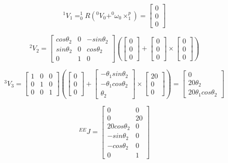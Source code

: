 \documentclass[12pt]{article}
\begin{document}
\[
^1 V_1=^1_0 R\left(^0 V_0 + ^0 \omega_0 \times ^p_1\right) =  
\left[
\begin{array}{c}
0\\
0\\
0
\end{array} \right] 
\]

\[
^2 V_2 = \left[
\begin{array}{ccc}
cos\theta_2 & 0 & -sin\theta_2 \\
sin\theta_2 & 0 & cos\theta_2\\
0 & 1 & 0 
\end{array} \right]
\left(
\left[
\begin{array}{c}
0\\
0\\
0
\end{array} \right] +
\left[
\begin{array}{c}
0\\
0\\
0
\end{array} \right] \times
\left[
\begin{array}{c}
0\\
0\\
0
\end{array} \right] \right)
\]

\[
^3 V_3 = \left[
\begin{array}{ccc}
1 & 0 & 0 \\
0 & 1 & 0\\
0 & 0 & 1 
\end{array} \right]
\left(
\left[
\begin{array}{c}
0\\
0\\
0
\end{array} \right] +
\left[
\begin{array}{c}
-\theta_1 sin\theta_2\\
-\theta_1 cos\theta_2\\
\theta_2
\end{array} \right]  \times
\left[
\begin{array}{c}
20\\
0\\
0
\end{array} \right] \right) = 
\left[
\begin{array}{c}
0\\
20\theta_2\\
20\theta_1 cos\theta_2
\end{array} \right] 
\]

\[
^{EE}J=
\left[
\begin{array}{cc}
0 & 0 \\
0 & 20\\
20cos\theta_2 & 0\\
-sin\theta_2 & 0\\
-cos\theta_2 & 0\\
0 & 1
\end{array} \right] 
\]
\end{document}
